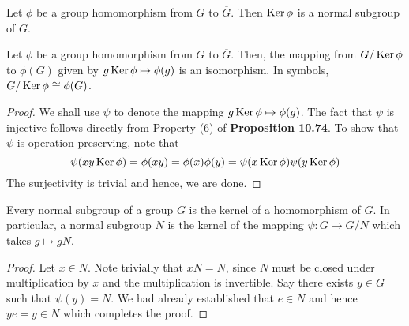 \begin{corollary}
	Let $\phi$ be a group homomorphism from $G$ to $\overline{G}$. Then $\operatorname{Ker}\phi$ is a normal subgroup of $G$.
\end{corollary}

\begin{theorem}[Jordan, 1870]
	Let $\phi$ be a group homomorphism from $G$ to $\overline{G}$. Then, the mapping from $G/\operatorname{Ker}\phi$ to $\phi(G)$ given by $g\operatorname{Ker}\phi\mapsto\phi(g)$ is an isomorphism. In symbols, $G/\operatorname{Ker}\phi\cong\phi(G)$.
\end{theorem}
\begin{proof}
	We shall use $\psi$ to denote the mapping $g\operatorname{Ker}\phi\mapsto\phi(g)$. The fact that $\psi$ is injective follows directly from Property (6) of \textbf{Proposition 10.74}. To show that $\psi$ is operation preserving, note that 
	$$
	\psi(xy\operatorname{Ker}\phi) = \phi(xy) = \phi(x)\phi(y) = \psi(x\operatorname{Ker}\phi)\psi(y\operatorname{Ker}\phi)
	$$
	The surjectivity is trivial and hence, we are done.
\end{proof}

\begin{proposition}
	Every normal subgroup of a group $G$ is the kernel of a homomorphism of $G$. In particular, a normal subgroup $N$ is the kernel of the mapping $\psi:G\to G/N$ which takes $g\mapsto gN$.
\end{proposition}
\begin{proof}
	Let $x\in N$. Note trivially that $xN=N$, since $N$ must be closed under multiplication by $x$ and the multiplication is invertible. Say there exists $y\in G$ such that $\psi(y)=N$. We had already established that $e\in N$ and hence $ye=y\in N$ which completes the proof.
\end{proof}